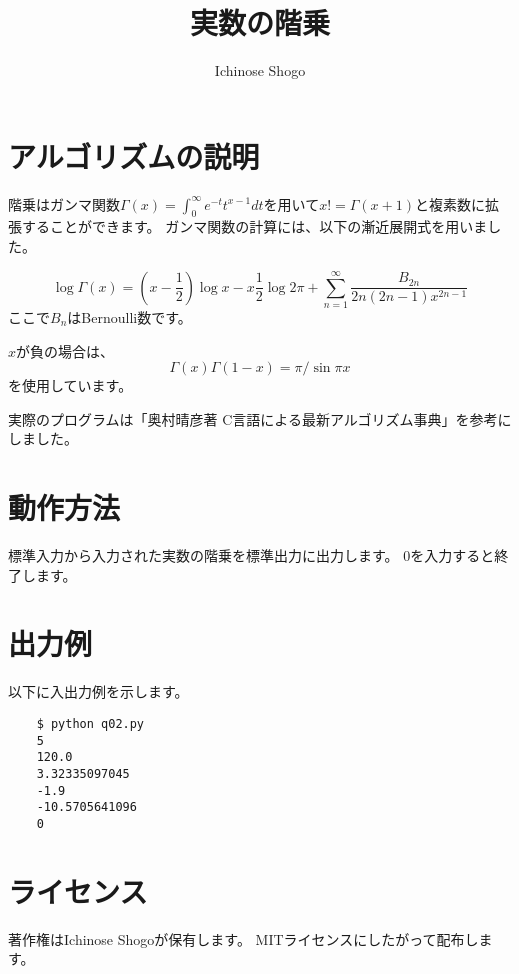 \documentclass{jsarticle}
\title{実数の階乗}
\author{Ichinose Shogo}
\begin{document}
\maketitle

\section{アルゴリズムの説明}
階乗はガンマ関数$\Gamma (x) = \int_0^\infty e^{-t}t^{x-1}dt$を用いて$x!=\Gamma (x+1)$と複素数に拡張することができます。
ガンマ関数の計算には、以下の漸近展開式を用いました。

\[
\log \Gamma (x) = (x-\frac{1}{2})\log x - x \frac{1}{2}\log 2\pi + \sum_{n=1}^\infty \frac{B_{2n}}{2n(2n-1)x^{2n-1}}
\]
ここで$B_n$はBernoulli数です。

$x$が負の場合は、
\[
\Gamma (x) \Gamma(1-x) = \pi / \sin \pi x
\]
を使用しています。

実際のプログラムは「奥村晴彦著 C言語による最新アルゴリズム事典」を参考にしました。

\section{動作方法}
標準入力から入力された実数の階乗を標準出力に出力します。
0を入力すると終了します。

\section{出力例}
以下に入出力例を示します。
\begin{verbatim}
    $ python q02.py
    5
    120.0
    3.32335097045
    -1.9
    -10.5705641096
    0
\end{verbatim}

\section{ライセンス}
著作権はIchinose Shogoが保有します。
MITライセンスにしたがって配布します。
\end{document}
